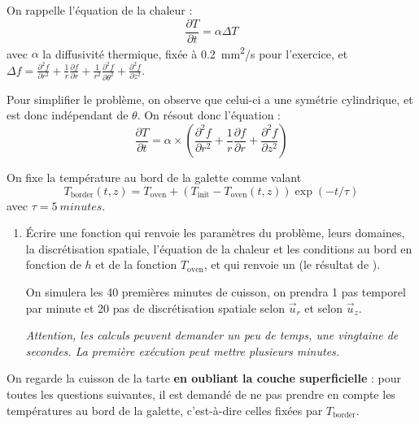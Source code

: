 \documentclass{article}
\newcommand{\paren}[1]{\ensuremath{\left(#1\right)}}
\begin{document}
On rappelle l'équation de la chaleur :
\[\frac{\partial T}{\partial t} = \alpha\Delta T\]
avec $\alpha$ la diffusivité thermique, fixée à \qty{0.2}{mm^2/s} pour l'exercice, et $\Delta f = \frac{\partial^2f}{\partial r^2} + \frac1r\frac{\partial f}{\partial r} + \frac1{r^2}\frac{\partial^2f}{\partial \theta^2} + \frac{\partial^2f}{\partial z^2}$.

Pour simplifier le problème, on observe que celui-ci a une symétrie cylindrique, et est donc indépendant de $\theta$. On résout donc l'équation :
\[\frac{\partial T}{\partial t} = \alpha\times\paren{\frac{\partial^2f}{\partial r^2} + \frac1r\frac{\partial f}{\partial r} + \frac{\partial^2f}{\partial z^2}}\]


On fixe la température au bord de la galette comme valant
\[T_{\text{border}}(t, z) = T_{\text{oven}} + \paren{T_{\text{init}} - T_{\text{oven}}(t, z)}\exp\paren{-t/\tau}\] avec $\tau = \qty{5}{minutes}$.

\begin{enumerate}
	\item Écrire une fonction qui renvoie les paramètres du problème, leurs domaines, la discrétisation spatiale, l'équation de la chaleur et les conditions au bord en fonction de $h$ et de la fonction $T_{\text{oven}}$, et qui renvoie un  (le résultat de ).
	
	On simulera les 40 premières minutes de cuisson, on prendra 1 pas temporel par minute et 20 pas de discrétisation spatiale selon $\vec u_r$ et selon $\vec u_z$.
	
	\textit{Attention, les calculs peuvent demander un peu de temps, une vingtaine de secondes. La première exécution peut mettre plusieurs minutes.}
\end{enumerate}

On regarde la cuisson de la tarte \textbf{en oubliant la couche superficielle} : pour toutes les questions suivantes, il est demandé de ne pas prendre en compte les températures au bord de la galette, c'est-à-dire celles fixées par $T_{\text{border}}$.
\end{document}
